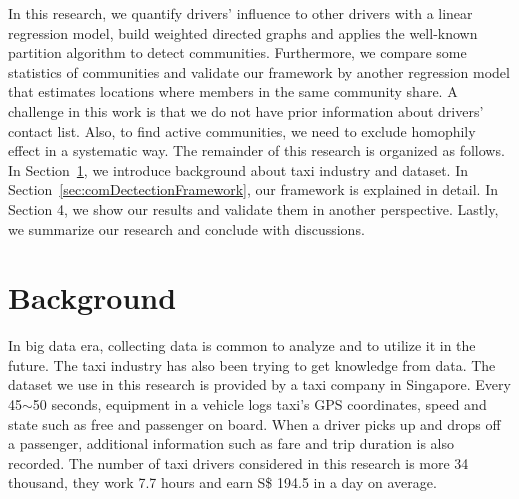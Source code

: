 \documentclass{article}
\begin{document}
In this research, we quantify drivers' influence to other drivers with a linear regression model, build weighted directed graphs and applies the well-known partition algorithm to detect communities. Furthermore, we compare some statistics of communities and validate our framework by another regression model that estimates locations where members in the same community share. A challenge in this work is that we do not have prior information about drivers' contact list. Also, to find active communities, we need to exclude homophily effect in a systematic way. The remainder of this research is organized as follows. In Section~\ref{sec:background}, we introduce background about taxi industry and dataset. In Section~\ref{sec:comDectectionFramework}, our framework is explained in detail. In Section 4, we show our results and validate them in another perspective. Lastly, we summarize our research and conclude with discussions.


\section{Background} \label{sec:background}

In big data era, collecting data is common to analyze and to utilize it in the future. The taxi industry has also been trying to get knowledge from data. The dataset we use in this research is provided by a taxi company in Singapore. Every 45$\sim$50 seconds, equipment in a vehicle logs taxi's GPS coordinates, speed and state such as free and passenger on board. When a driver picks up and drops off a passenger, additional information such as fare and trip duration is also recorded. The number of taxi drivers considered in this research is more 34 thousand, they work 7.7 hours and earn S\$ 194.5 in a day on average.
\end{document}
